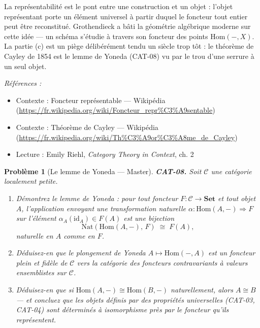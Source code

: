 \documentclass[11pt]{article}
\newtheorem{problem}{Problème}
\newenvironment{refs}{\par\small\noindent\emph{Références :}\begin{itemize}\setlength\itemsep{0pt}}{\end{itemize}\normalsize}
\begin{document}
\noindent La représentabilité est le pont entre \og{} une construction \fg{} et \og{} un objet \fg{} :
l'objet représentant porte un élément universel à partir duquel le foncteur tout entier peut être
reconstitué. Grothendieck a bâti la géométrie algébrique moderne sur cette idée --- un schéma
s'étudie à travers son foncteur des points $ \mathrm{Hom}(-, X) $. La partie (c) est un piège
délibérément tendu un siècle trop tôt : le théorème de Cayley de 1854 est le lemme de Yoneda
(CAT-08) vu par le trou d'une serrure à un seul objet.

\begin{refs}
\item Contexte : Foncteur représentable --- Wikipédia (\url{https://fr.wikipedia.org/wiki/Foncteur_repr%C3%A9sentable})
\item Contexte : Théorème de Cayley --- Wikipédia (\url{https://fr.wikipedia.org/wiki/Th%C3%A9or%C3%A8me_de_Cayley})
\item Lecture : Emily Riehl, \textit{Category Theory in Context}, ch. 2
\end{refs}

\bigskip

\begin{problem}[{Le lemme de Yoneda --- Master}]
\textbf{CAT-08.} Soit $ \mathcal{C} $ une catégorie localement petite.
\begin{enumerate}
\item[(a)] Démontrez le lemme de Yoneda : pour tout foncteur $ F\colon \mathcal{C} \to \mathbf{Set} $ et
tout objet $ A $, l'application envoyant une transformation naturelle
$ \alpha\colon \mathrm{Hom}(A,-) \Rightarrow F $ sur l'élément
$ \alpha_A(\mathrm{id}_A) \in F(A) $ est une bijection
\[ \mathrm{Nat}(\mathrm{Hom}(A,-),\, F) \;\cong\; F(A), \]
naturelle en $ A $ comme en $ F $.
\item[(b)] Déduisez-en que le plongement de Yoneda $ A \mapsto
\mathrm{Hom}(-, A) $ est un foncteur plein et fidèle de $ \mathcal{C} $ vers la
catégorie des foncteurs contravariants à valeurs ensemblistes sur $ \mathcal{C} $.
\item[(c)] Déduisez-en que si
$ \mathrm{Hom}(A,-) \cong \mathrm{Hom}(B,-) $ naturellement, alors $ A \cong B $ --- et
concluez que les objets définis par des propriétés universelles (CAT-03, CAT-04) sont déterminés
à isomorphisme près par le foncteur qu'ils représentent.
\end{enumerate}

\end{problem}
\end{document}
